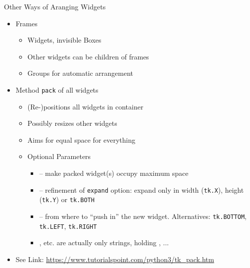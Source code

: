 \begin{frame}[fragile]{Other Ways of Aranging Widgets}
%
\begin{itemize}
\item Frames
	\begin{itemize}
	\item Widgets, invisible Boxes
	\item Other widgets can be children of frames
	\item Groups for automatic arrangement
	\end{itemize}
\item Method \texttt{pack} of all widgets
	\begin{itemize}
	\item (Re-)positions all widgets in container
	\item Possibly resizes other widgets
	\item Aims for equal space for everything
	\item Optional Parameters
		\begin{itemize}
		\item {} -- make packed widget(s) occupy maximum space
		\item {} -- refinement of \texttt{expand} option: expand only in width (\texttt{tk.X}), height (\texttt{tk.Y}) or \texttt{tk.BOTH}
		\item {} -- from where to \enquote{push in} the new widget. Alternatives: \texttt{tk.BOTTOM}, \texttt{tk.LEFT}, \texttt{tk.RIGHT}
		\item {}, etc. are actually only strings, holding , ...
		\end{itemize}
	\end{itemize}
\item See Link: {\scriptsize \url{https://www.tutorialspoint.com/python3/tk_pack.htm}}
\end{itemize}
%
\end{frame}


